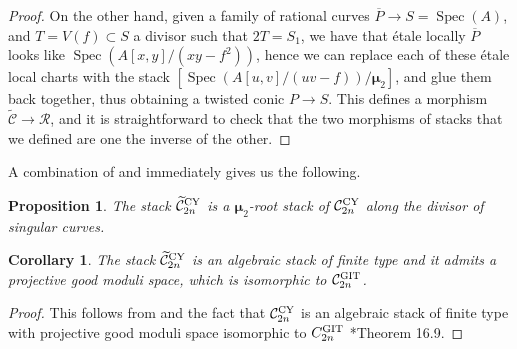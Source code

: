 \documentclass{amsart}
\newcommand{\bP}{\mathbb{P}}
\newcommand{\cB}{\mathcal{B}}
\newcommand{\cC}{\mathcal{C}}
\newcommand{\cO}{\mathcal{O}}
\newcommand{\cR}{\mathcal{R}}
\newcommand{\spec}{\operatorname{Spec}}
\newcommand{\PGL}{\operatorname{PGL}}
\newcommand{\bmu}{\bm{\mu}}
\newcommand{\git}{{\rm GIT}}
\newcommand{\CY}{{\rm CY}}
\newtheorem{Lemma}[theorem]{Lemma}
\newtheorem{Cor}[theorem]{Corollary}
\newtheorem{Prop}[theorem]{Proposition}
\theoremstyle{definition}
\theoremstyle{definition}
\begin{document}
{\begin{proof}
    On the other hand, given a family of rational curves $\overline{P}\to S=\spec(A)$, and $T=V(f)\subset S$ a divisor such that $2T=S_1$, we have that \'etale locally $\overline{P}$ looks like $\spec(A[x,y]/(xy-f^2))$, hence we can replace each of these \'etale local charts with the stack $[\spec(A[u,v]/(uv-f))/\bmu_2]$, and glue them back together, thus obtaining a twisted conic $P\to S$. This defines a morphism $\widetilde{\cC}\to \cR$, and it is straightforward to check that the two morphisms of stacks that we defined are one the inverse of the other.
\end{proof}
A combination of  and  immediately gives us the following.
\begin{Prop}\label{prop:Ctilde is root}
    The stack $\widetilde{\cC}^{\CY}_{2n}$ is a $\bmu_2$-root stack of $\cC^{\CY}_{2n}$ along the divisor of singular curves.
\end{Prop}
\begin{Cor}\label{cor:Ctilde has gms}
    The stack $\widetilde{\cC}^{\CY}_{2n}$ is an algebraic stack of finite type and it admits a projective good moduli space, which is isomorphic to $\cC^{\git}_{2n}$.
\end{Cor}
\begin{proof}
    This follows from  and the fact that $\cC^{\CY}_{2n}$ is an algebraic stack of finite type with projective good moduli space isomorphic to $C^{\git}_{2n}$ \cite{ascher2023moduli}*{Theorem 16.9}.
\end{proof}
}
\end{document}

